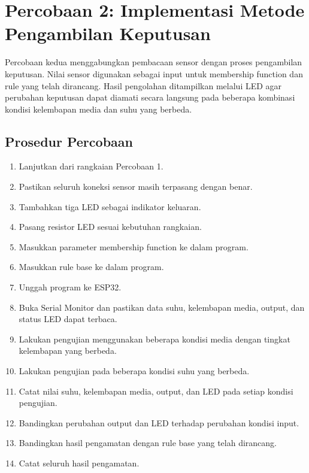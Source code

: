 \documentclass[12pt,a4paper]{article}
\begin{document}
\noindent
\makebox[\textwidth]{\hrulefill}

\vspace{0.4cm}

\noindent
\makebox[\textwidth]{\hrulefill}

\section{Percobaan 2: Implementasi Metode Pengambilan Keputusan}

Percobaan kedua menggabungkan pembacaan sensor dengan proses pengambilan keputusan. Nilai sensor digunakan sebagai input untuk membership function dan rule yang telah dirancang. Hasil pengolahan ditampilkan melalui LED agar perubahan keputusan dapat diamati secara langsung pada beberapa kombinasi kondisi kelembapan media dan suhu yang berbeda.

\subsection{Prosedur Percobaan}

\begin{enumerate}
    \item Lanjutkan dari rangkaian Percobaan 1.
    \item Pastikan seluruh koneksi sensor masih terpasang dengan benar.
    \item Tambahkan tiga LED sebagai indikator keluaran.
    \item Pasang resistor LED sesuai kebutuhan rangkaian.
    \item Masukkan parameter membership function ke dalam program.
    \item Masukkan rule base ke dalam program.
    \item Unggah program ke ESP32.
    \item Buka Serial Monitor dan pastikan data suhu, kelembapan media, output, dan status LED dapat terbaca.
    \item Lakukan pengujian menggunakan beberapa kondisi media dengan tingkat kelembapan yang berbeda.
    \item Lakukan pengujian pada beberapa kondisi suhu yang berbeda.
    \item Catat nilai suhu, kelembapan media, output, dan LED pada setiap kondisi pengujian.
    \item Bandingkan perubahan output dan LED terhadap perubahan kondisi input.
    \item Bandingkan hasil pengamatan dengan rule base yang telah dirancang.
    \item Catat seluruh hasil pengamatan.
\end{enumerate}
\end{document}
